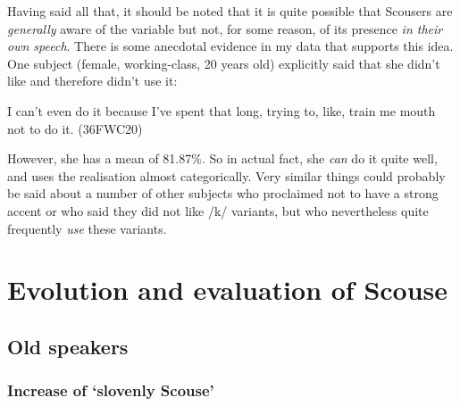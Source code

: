 Having said all that, it should be noted that it is quite possible that Scousers are \emph{generally} aware of the variable but not, for some reason, of its presence \emph{in their own speech}.
There is some anecdotal evidence in my data that supports this idea.
One subject (female, working-class, 20 years old) explicitly said that she didn't like  and therefore didn't use it:
\begin{example}
	I can't even do it because I've spent that long, trying to, like, train me mouth not to do it. (36FWC20)
\end{example}
However, she has a mean  of 81.87\%.
So in actual fact, she \emph{can} do it quite well, and uses the  realisation almost categorically.
Very similar things could probably be said about a number of other subjects who proclaimed not to have a strong  accent or who said they did not like  /k/ variants, but who nevertheless quite frequently \emph{use} these variants.

\section{Evolution and evaluation of Scouse}
\label{aware_res.eval}

\subsection{Old speakers}
\label{aware_res.eval.old}

\subsubsection{Increase of `slovenly Scouse'}
\label{aware_res.eval.old.change}

